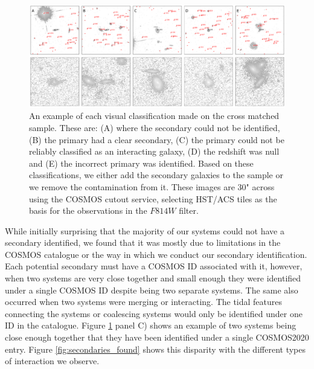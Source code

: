 \begin{figure}
\centering
\includegraphics[width=\textwidth]{Chapter3/figures/cutouts_ex.pdf}
\caption[An example of each visual classification made on the cross matched sample.]{An example of each visual classification made on the cross matched sample. These are: (A) where the secondary could not be identified, (B) the primary had a clear secondary, (C) the primary could not be reliably classified as an interacting galaxy, (D) the redshift was null and (E) the incorrect primary was identified. Based on these classifications, we either add the secondary galaxies to the sample or we remove the contamination from it. These images are 30" across using the COSMOS cutout service, selecting HST/ACS tiles as the basis for the observations in the $F814W$ filter.}
\label{fig:secondary_selection}
\end{figure}

While initially surprising that the majority of our systems could not have a secondary identified, we found that it was mostly due to limitations in the COSMOS catalogue or the way in which we conduct our secondary identification. Each potential secondary must have a COSMOS ID associated with it, however, when two systems are very close together and small enough they were identified under a single COSMOS ID despite being two separate systems. The same also occurred when two systems were merging or interacting. The tidal features connecting the systems or coalescing systems would only be identified under one ID in the catalogue. Figure \ref{fig:secondary_selection} panel C) shows an example of two systems being close enough together that they have been identified under a single COSMOS2020 entry. Figure \ref{fig:secondaries_found} shows this disparity with the different types of interaction we observe.

